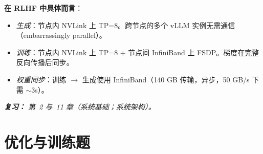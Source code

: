 \begin{questionbox}
\textbf{在 RLHF 中具体而言}：

\begin{itemize}
  \item \emph{生成}：节点内 NVLink 上 TP=8。跨节点的多个 vLLM 实例无需通信（embarrassingly parallel）。
  \item \emph{训练}：节点内 NVLink 上 TP=8 + 节点间 InfiniBand 上 FSDP。梯度在完整反向传播后同步。
  \item \emph{权重同步}：训练 $\to$ 生成使用 InfiniBand（140 GB 传输，异步，50 GB/s 下需 $\sim$3s）。
\end{itemize}

\emph{\textbf{复习：} 第~2 与~11 章（系统基础；系统架构）。}
\end{questionbox}

\section{优化与训练题}
\label{optimization-and-training-questions}


